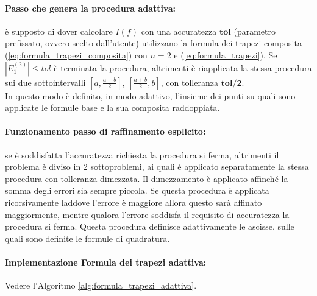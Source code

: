 \paragraph{Passo che genera la procedura adattiva:} è supposto di dover calcolare $I(f)$ con una accuratezza $\boldsymbol{tol}$ (parametro prefissato, ovvero scelto dall'utente) utilizzano la formula dei trapezi composita (\ref{eq:formula_trapezi_composita}) con $n=2$ e (\ref{eq:formula_trapezi}). Se $|E_1^{(2)}|\leq tol$ è terminata la procedura, altrimenti è riapplicata la stessa procedura sui due sottointervalli $\left[a,\frac{a+b}{2}\right],\, \left[\frac{a+b}{2},b\right]$, con tolleranza $\boldsymbol{tol/2}$.\\
In questo modo è definito, in modo adattivo, l'insieme dei punti su quali sono applicate le formule base e la sua composita raddoppiata.

\paragraph{Funzionamento passo di raffinamento esplicito:} se è soddisfatta l'accuratezza richiesta la procedura si ferma, altrimenti il problema è diviso in 2 sottoproblemi, ai quali è applicato separatamente la stessa procedura con tolleranza dimezzata. Il dimezzamento è applicato affinché la somma degli errori sia sempre piccola. Se questa procedura è applicata ricorsivamente laddove l'errore è maggiore allora questo sarà affinato maggiormente, mentre qualora l'errore soddisfa il requisito di accuratezza la procedura si ferma. Questa procedura definisce adattivamente le ascisse, sulle quali sono definite le formule di quadratura.

\paragraph{Implementazione Formula dei trapezi adattiva:} Vedere l'Algoritmo \ref{alg:formula_trapezi_adattiva}.

